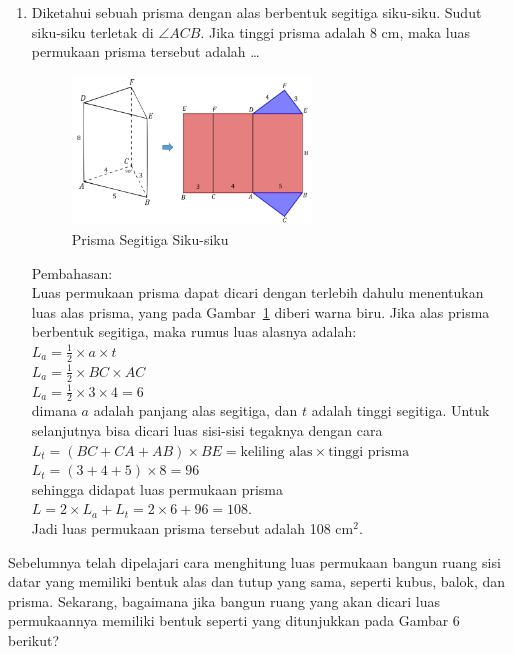 \documentclass[12pt]{article}
\begin{document}
\begin{enumerate}
\begin{enumerate}
        \begin{enumerate}[label=\arabic*)]
            \item Diketahui sebuah prisma dengan alas berbentuk segitiga siku-siku. Sudut siku-siku terletak di \( \angle ACB \). Jika tinggi prisma adalah 8 cm, maka luas permukaan prisma tersebut adalah \dots\\
            \begin{figure}[H]
                \centering
                \includegraphics[width=0.6\textwidth]{images/prismasegitigasiku.png}
                \caption{Prisma Segitiga Siku-siku}
                \label{prismasegitigasiku}
            \end{figure}
            Pembahasan:\\
            Luas permukaan prisma dapat dicari dengan terlebih dahulu menentukan luas alas prisma, yang pada Gambar~\ref{prismasegitigasiku} diberi warna biru. Jika alas prisma berbentuk segitiga, maka rumus luas alasnya adalah:\\
            $ L_a = \frac{1}{2} \times a \times t $\\
            $ L_a = \frac{1}{2} \times BC \times AC$\\
            $ L_a = \frac{1}{2} \times 3 \times 4 = 6$\\
            dimana \(a\) adalah panjang alas segitiga, dan \(t\) adalah tinggi segitiga. Untuk selanjutnya bisa dicari luas sisi-sisi tegaknya dengan cara\\
            $ L_t = (BC + CA + AB) \times BE = \text{keliling alas} \times \text{tinggi prisma} $\\
            $ L_t = (3+4+5) \times 8 = 96 $\\
            sehingga didapat luas permukaan prisma\\
            $ L = 2\times L_a + L_t = 2 \times 6 + 96 = 108. $\\
            Jadi luas permukaan prisma tersebut adalah 108 \( \text{cm}^2.\)
        \end{enumerate}
        \hspace*{1cm}Sebelumnya telah dipelajari cara menghitung luas permukaan bangun ruang sisi datar yang memiliki bentuk alas dan tutup yang sama, seperti kubus, balok, dan prisma. Sekarang, bagaimana jika bangun ruang yang akan dicari luas permukaannya memiliki bentuk seperti yang ditunjukkan pada Gambar 6 berikut?
    \end{enumerate}


\end{enumerate}
\end{document}
